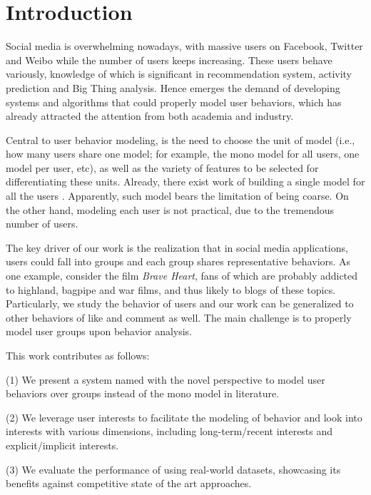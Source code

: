 \section{Introduction}
\label{sec:intro}

Social media is overwhelming nowadays, with massive users on Facebook, Twitter and Weibo while the number of users keeps increasing.
These users behave variously, knowledge of which is significant in recommendation system, activity prediction and Big Thing analysis.
Hence emerges the demand of developing systems and algorithms that could properly model user behaviors, which has already attracted the attention from both academia and industry.

Central to user behavior modeling, is the need to choose the unit of model (i.e., how many users share one model; for example, the mono model for all users, one model per user, etc), as well as the variety of features to be selected for differentiating these units.
Already, there exist work of building a single model for all the users \cite{IEEEexample:conf/wsdm/FengW13,IEEEexample:conf/ijcai/ZhangLTCL13,IEEEexample:journals/tkdd/ZhangTLLX15}.
Apparently, such model bears the limitation of being coarse.
On the other hand, modeling each user is not practical, due to the tremendous number of users.

The key driver of our work is the realization that in social media applications, users could fall into groups and each group shares representative behaviors.
%
As one example, consider the film \textit{Brave Heart}, fans of which are probably addicted to highland, bagpipe and war films, and thus likely to \ret{} blogs of these topics.
Particularly, we study the \retg{} behavior of users and our work can be generalized to other behaviors of like and comment as well.
The main challenge is to properly model user groups upon behavior analysis.

This work contributes as follows:

\stab(1) We present a system named \sys{} with the novel perspective to model user behaviors over groups instead of the mono model in literature.

\stab(2) We leverage user interests to facilitate the modeling of \retg{} behavior and look into interests with various dimensions, including long-term/recent interests and explicit/implicit interests.

\stab(3) We evaluate the performance of \sys{} using real-world datasets, showcasing its benefits against competitive state of the art approaches.



